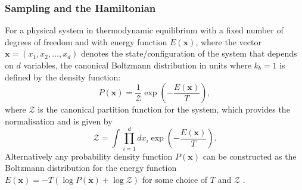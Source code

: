 \documentclass[12pt]{article}
\begin{document}
        \subsubsection{Sampling and the Hamiltonian}
            \label{sec:SamplingAndTheHamiltonian}
            For a physical system in thermodynamic equilibrium with a fixed number of degrees of freedom and with energy function $E\left(\bm{x}\right)$, where the vector $\bm{x} = \left(x_{1},x_{2},\dots,x_{d}\right)$ denotes the state/configuration of the system that depends on $d$ variables, the canonical Boltzmann distribution in units where $k_b=1$ is defined by the density function:
            \begin{equation}
                \label{eq:BoltzmannDistribution}
                P\left(\bm{x}\right) = \frac{1}{\mathcal{Z}} \exp{\left(-\frac{E\left(\bm{x}\right)}{T} \right)},
            \end{equation}
            where $\mathcal{Z}$ is the canonical partition function for the system, which provides the normalisation and is given by 
            \begin{equation}
                \label{eq:JointPartitionFunction}
                \mathcal{Z} = \int\prod_{i=1}^{d}dx_{i} \exp{\left(-\frac{E\left(\bm{x}\right)}{T} \right)}.
            \end{equation}
            Alternatively any probability density function $P\left(\bm{x}\right)$ can be constructed as the Boltzmann distribution for the energy function $ E\left(\bm{x}\right) = -T\left(\log{P\left(\bm{x}\right)} + \log{\mathcal{Z}}\right)$ for some choice of $T$ and $\mathcal{Z}$ \cite{neal_2011}. 
\end{document}

